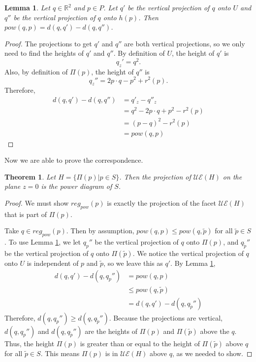 \documentclass[a4paper, 11pt]{article}
\newtheorem{theorem}{Theorem}[section]
\newtheorem{lemma}{Lemma}[section]
\newcommand{\R}{\mathbb{R}}
\begin{document}
\begin{lemma}
  \label{lem:proj}
  Let $q \in \R^2$ and $p \in P$. Let $q'$ be the vertical projection of $q$ onto $U$ and $q''$ be the vertical projection of $q$ onto $h(p)$. Then
  $pow(q, p) = d(q, q') - d(q, q'')$.
\end{lemma}
\begin{proof}
  The projections to get $q'$ and $q''$ are both vertical projections, so we only need to find the heights of $q'$ and $q''$. By
  definition of $U$, the height of $q'$ is
  \[ q_z' = q^2.\]
  Also, by definition of $\Pi(p)$, the height of $q''$ is
  \[ q_z'' = 2p \cdot q - p^2 + r^2(p) . \]
  Therefore,
  \begin{align*}
    d(q,q') - d(q,q'') &= q'_z - q''_z \\
    &= q^2 - 2 p \cdot q + p^2 - r^2(p) \\
    &= (p-q)^2 - r^2(p) \\
    &= pow(q,p)
  \end{align*}
\end{proof}

Now we are able to prove the correspondence.

\begin{theorem}
  Let $H = \{ \Pi(p) | p \in S \}$. Then the projection of $\mathcal{UE}(H)$ on the plane $z=0$ is the power diagram of $S$.
  \label{thm:ue_to_pow}
\end{theorem}
\begin{proof}
  We must show $reg_{pow}(p)$ is exactly the projection of the facet $\mathcal{UE}(H)$ that is part of $\Pi(p)$.

  Take $q \in reg_{pow}(p)$. Then by assumption, $pow(q,p) \leq pow(q,\tilde{p})$ for all $\tilde{p} \in S$. To use Lemma \ref{lem:proj}, we let $q_p''$ be the
  vertical projection of $q$ onto $\Pi(p)$, and $q_{\tilde{p}}''$ be the vertical projection of $q$ onto $\Pi(\tilde{p})$. We notice the vertical projection
  of $q$ onto $U$ is independent of $p$ and $\tilde{p}$, so we leave this as $q'$. By Lemma \ref{lem:proj},
  \begin{align*}
    d(q,q') - d(q,q_p'') &= pow(q,p) \\
    &\leq pow(q,\tilde{p}) \\
    &= d(q,q') - d(q,q_{\tilde{p}}'')
  \end{align*}
  Therefore, $d(q,q_p'') \geq d(q, q_{\tilde{p}}'')$. Because the projections are vertical, $d(q,q_p'')$ and $d(q, q_{\tilde{p}}'')$ are the heights of
  $\Pi(p)$ and $\Pi(\tilde{p})$ above the $q$. Thus, the height $\Pi(p)$ is greater than or equal to the height of $\Pi(\tilde{p})$ above $q$ for all
  $\tilde{p} \in S$. This means $\Pi(p)$ is in $\mathcal{UE}(H)$ above $q$, as we needed to show.
\end{proof}
\end{document}
